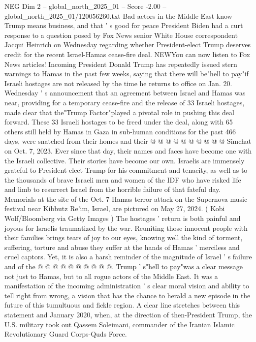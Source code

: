 \begin{textsample}{NEG Dim 2 – global\_north\_2025\_01 – Score -2.00 – global\_north\_2025\_01/120056260.txt}  \label{ex:f2_neg_081}
Bad actors in the Middle East know Trump means business, and that ' s good for peace President Biden had a curt response to a question posed by Fox News senior White House correspondent Jacqui Heinrich on Wednesday regarding whether President-elect Trump deserves credit for the recent Israel-Hamas cease-fire deal.
NEWYou can now listen to Fox News articles!
Incoming President Donald Trump has repeatedly issued stern warnings to Hamas in the past few weeks, saying that there will be"hell to pay"if Israeli hostages are not released by the time he returns to office on Jan. 20.
Wednesday ' s announcement that an agreement between Israel and Hamas was near, providing for a temporary cease-fire and the release of 33 Israeli hostages, made clear that the"Trump Factor"played a pivotal role in pushing this deal forward.
These 33 Israeli hostages to be freed under the deal, along with 65 others still held by Hamas in Gaza in sub-human conditions for the past 466 days, were snatched from their homes and their @ @ @ @ @ @ @ @ @ @ Simchat on Oct. 7, 2023.
Ever since that day, their names and faces have become one with the Israeli collective.
Their stories have become our own.
Israelis are immensely grateful to President-elect Trump for his commitment and tenacity, as well as to the thousands of brave Israeli men and women of the IDF who have risked life and limb to resurrect Israel from the horrible failure of that fateful day.
Memorials at the site of the Oct. 7 Hamas terror attack on the Supernova music festival near Kibbutz Re'im, Israel, are pictured on May 27, 2024. ( Kobi Wolf/Bloomberg via Getty Images ) The hostages ' return is both painful and joyous for Israelis traumatized by the war.
Reuniting those innocent people with their families brings tears of joy to our eyes, knowing well the kind of torment, suffering, torture and abuse they suffer at the hands of Hamas ' merciless and cruel captors.
Yet, it is also a harsh reminder of the magnitude of Israel ' s failure and of the @ @ @ @ @ @ @ @ @ @.
Trump ' s"hell to pay"was a clear message not just to Hamas, but to all rogue actors of the Middle East.
It was a manifestation of the incoming administration ' s clear moral vision and ability to tell right from wrong, a vision that has the chance to herald a new episode in the future of this tumultuous and fickle region.
A clear line stretches between this statement and January 2020, when, at the direction of then-President Trump, the U.S. military took out Qassem Soleimani, commander of the Iranian Islamic Revolutionary Guard Corps-Quds Force.

\end{textsample}
